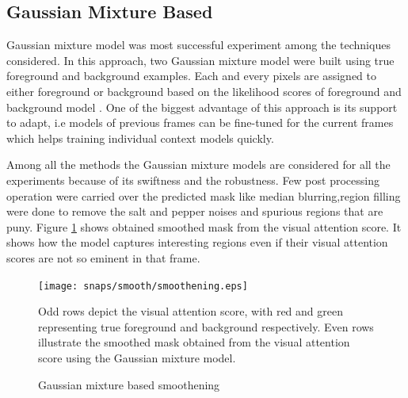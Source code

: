 \subsection{Gaussian Mixture Based}
Gaussian mixture model was  most successful experiment among the techniques considered.  In this approach, two Gaussian mixture model were built using true foreground and background  examples. Each and every pixels are assigned to either foreground or background based on the likelihood scores of foreground and background model . One of the biggest advantage of this approach is its support to adapt, i.e models of previous frames can be fine-tuned for the current frames which helps training individual context models quickly.
\par Among all the methods the Gaussian mixture models are considered for all the experiments because of its swiftness and the robustness. Few post processing operation were carried over the predicted mask like median blurring,region filling were done to remove the salt and pepper noises and spurious regions that are puny. Figure \ref{fig:smoothen}  shows obtained smoothed mask from the visual attention score. It shows how the model captures interesting regions even if their visual attention scores are not so eminent in that frame.
\begin{figure}[!htpb]
   \begin{center}
	    \texttt{[image: snaps/smooth/smoothening.eps]}     
     \caption {Gaussian mixture based smoothening}
 	\medskip 
 	\small Odd rows depict the visual attention score, with red and green representing true foreground and background respectively. Even rows illustrate the smoothed mask obtained from the visual attention score using the Gaussian mixture model. 
   \label{fig:smoothen}
   \end{center}
 \end{figure}
